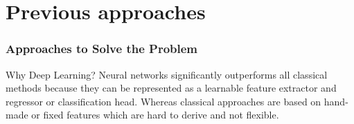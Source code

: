 \documentclass{beamer}
\begin{document}
\section{Previous approaches}

\begin{frame}
    \frametitle{Approaches to Solve the Problem}

    \centering

    \vspace*{0.5cm}
    \begin{block}{Why Deep Learning?}
        Neural networks significantly outperforms all classical
        methods because they can be represented as a learnable feature
        extractor and regressor or classification head. Whereas classical approaches are
        based on hand-made or fixed features which are hard to derive and not flexible.
    \end{block}

\end{frame}
\end{document}
